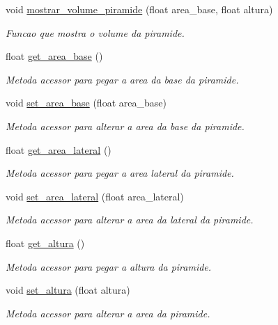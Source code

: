 \begin{DoxyCompactItemize}
void \hyperlink{classPiramide_a46b46e867a3acac325422627534e6902}{mostrar\+\_\+volume\+\_\+piramide} (float area\+\_\+base, float altura)
\begin{DoxyCompactList}\small\item\em Funcao que mostra o volume da piramide. \end{DoxyCompactList}\item 
float \hyperlink{classPiramide_ad97233120a836340667b2a6d95e1bb4e}{get\+\_\+area\+\_\+base} ()
\begin{DoxyCompactList}\small\item\em Metoda acessor para pegar a area da base da piramide. \end{DoxyCompactList}\item 
void \hyperlink{classPiramide_a3c29913c295f62f05813dc72baa3a36d}{set\+\_\+area\+\_\+base} (float area\+\_\+base)
\begin{DoxyCompactList}\small\item\em Metoda acessor para alterar a area da base da piramide. \end{DoxyCompactList}\item 
float \hyperlink{classPiramide_a868f5e0f60c0af1c6e1f6ff8f002ec19}{get\+\_\+area\+\_\+lateral} ()
\begin{DoxyCompactList}\small\item\em Metoda acessor para pegar a area lateral da piramide. \end{DoxyCompactList}\item 
void \hyperlink{classPiramide_aad0af6674d79dffcf0c17f82bd9625ad}{set\+\_\+area\+\_\+lateral} (float area\+\_\+lateral)
\begin{DoxyCompactList}\small\item\em Metoda acessor para alterar a area da lateral da piramide. \end{DoxyCompactList}\item 
float \hyperlink{classPiramide_aa70bdfef3f2974420224bfc043727193}{get\+\_\+altura} ()
\begin{DoxyCompactList}\small\item\em Metoda acessor para pegar a altura da piramide. \end{DoxyCompactList}\item 
void \hyperlink{classPiramide_a5a0b37acd4834fb528beeb985f385d6d}{set\+\_\+altura} (float altura)
\begin{DoxyCompactList}\small\item\em Metoda acessor para alterar a area da piramide. \end{DoxyCompactList}\end{DoxyCompactItemize}


